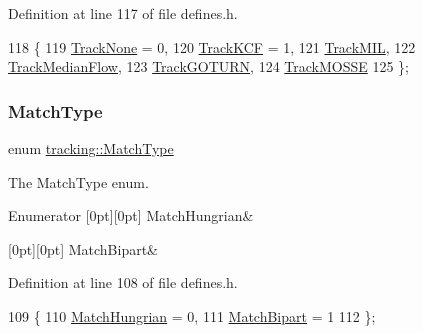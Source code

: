 Definition at line 117 of file defines.\+h.


\begin{DoxyCode}
118 \{
119     \mbox{\hyperlink{namespacetracking_a5377d69122ad915004ef68a518d22be3a3bd92892a83828375b9fce502732c491}{TrackNone}} = 0,
120     \mbox{\hyperlink{namespacetracking_a5377d69122ad915004ef68a518d22be3a9bba8e4377e562caa976576d47c5eb2e}{TrackKCF}} = 1,
121     \mbox{\hyperlink{namespacetracking_a5377d69122ad915004ef68a518d22be3a98b9586c66bb9e4b1e0fed027700a197}{TrackMIL}},
122     \mbox{\hyperlink{namespacetracking_a5377d69122ad915004ef68a518d22be3a637634260348d3b28ff4e28661bb417a}{TrackMedianFlow}},
123     \mbox{\hyperlink{namespacetracking_a5377d69122ad915004ef68a518d22be3a674ec8effe560545c87b0c14bd40f7f3}{TrackGOTURN}},
124     \mbox{\hyperlink{namespacetracking_a5377d69122ad915004ef68a518d22be3aa3948447c2ea9d8e9efef9b9433c70e2}{TrackMOSSE}}
125 \};
\end{DoxyCode}
\mbox{\label{namespacetracking_a491e50c9261ab820965d871a217d4f13}} 
\subsubsection{\texorpdfstring{Match\+Type}{MatchType}}
{\footnotesize\ttfamily enum \mbox{\hyperlink{namespacetracking_a491e50c9261ab820965d871a217d4f13}{tracking\+::\+Match\+Type}}}



The Match\+Type enum. 

\begin{DoxyEnumFields}{Enumerator}
[0pt][0pt]{}\mbox{\label{namespacetracking_a491e50c9261ab820965d871a217d4f13a8c97315e46df8c0716a9538655fc967d}} 
Match\+Hungrian&\\
\hline

[0pt][0pt]{}\mbox{\label{namespacetracking_a491e50c9261ab820965d871a217d4f13a41d2324dafb3393ff2cb54671c8b06ef}} 
Match\+Bipart&\\
\hline

\end{DoxyEnumFields}


Definition at line 108 of file defines.\+h.


\begin{DoxyCode}
109 \{
110     \mbox{\hyperlink{namespacetracking_a491e50c9261ab820965d871a217d4f13a8c97315e46df8c0716a9538655fc967d}{MatchHungrian}} = 0,
111     \mbox{\hyperlink{namespacetracking_a491e50c9261ab820965d871a217d4f13a41d2324dafb3393ff2cb54671c8b06ef}{MatchBipart}} = 1
112 \};
\end{DoxyCode}
